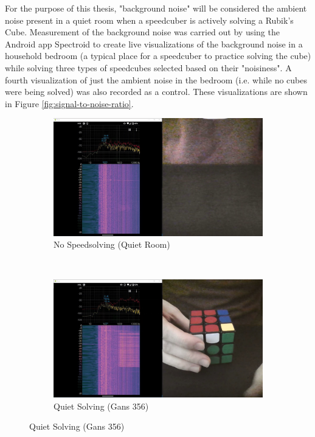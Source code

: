 For the purpose of this thesis, "background noise" will be considered the ambient noise present in a quiet room when a speedcuber is actively solving a Rubik's Cube.
Measurement of the background noise was carried out by using the Android app Spectroid \cite{googleplay-spectroid} to create live visualizations of the background noise in a household bedroom (a typical place for a speedcuber to practice solving the cube) while solving three types of speedcubes selected based on their "noisiness".
A fourth visualization of just the ambient noise in the bedroom (i.e. while no cubes were being solved) was also recorded as a control.
These visualizations are shown in Figure \ref{fig:signal-to-noise-ratio}.

\begin{figure}
    \centering
    \caption{Background Noise of a Quiet Room while Speedsolving}
    \label{fig:signal-to-noise-ratio}
    \begin{subfigure}{\textwidth}
        \centering
        \caption{No Speedsolving (Quiet Room)}
        \label{fig:signal-to-noise-ratio-silent}
        \includegraphics[width=\linewidth]{Figures/4 Protocol Design/Signal to Noise Ratio/silent_background_noise.jpg}
        \vspace*{2mm}
    \end{subfigure}\\
    \begin{subfigure}{\textwidth}
        \centering
        \caption{Quiet Solving (Gans 356)}
        \label{fig:signal-to-noise-ratio-356}
        \includegraphics[width=\linewidth]{Figures/4 Protocol Design/Signal to Noise Ratio/356_background_noise.jpg}
        \vspace*{2mm}
    \end{subfigure}
\end{figure}
